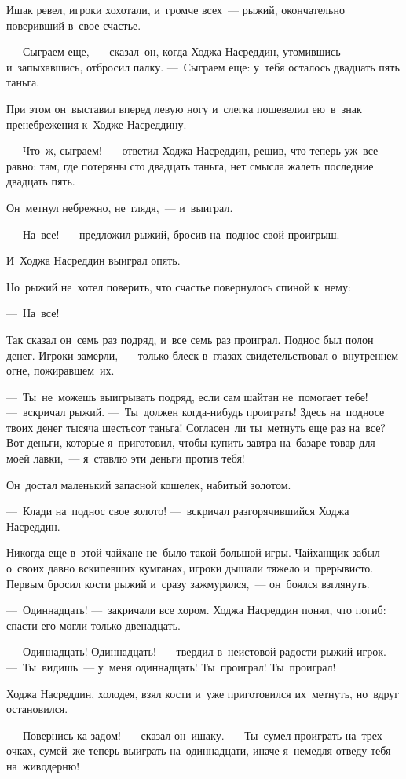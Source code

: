 \documentclass[12pt,a4paper]{book}
\begin{document}
Ишак ревел, игроки хохотали, и~громче всех~— рыжий, окончательно поверивший в~свое счастье.

—~Сыграем еще,~— сказал~он, когда Ходжа Насреддин, утомившись и~запыхавшись, отбросил палку. —~Сыграем еще: у~тебя осталось двадцать пять таньга.

При этом он~выставил вперед левую ногу и~слегка пошевелил ею~в~знак пренебрежения к~Ходже Насреддину.

—~Что~ж, сыграем! —~ответил Ходжа Насреддин, решив, что теперь уж~все равно: там, где потеряны сто двадцать таньга, нет смысла жалеть последние двадцать пять.

Он~метнул небрежно, не~глядя,~— и~выиграл.

—~На~все! —~предложил рыжий, бросив на~поднос свой проигрыш.

И~Ходжа Насреддин выиграл опять.

Но~рыжий не~хотел поверить, что счастье повернулось спиной к~нему:

—~На~все!

Так сказал он~семь раз подряд, и~все семь раз проиграл. Поднос был полон денег. Игроки замерли,~— только блеск в~глазах свидетельствовал о~внутреннем огне, пожиравшем~их.

—~Ты~не~можешь выигрывать подряд, если сам шайтан не~помогает тебе! —~вскричал рыжий. —~Ты~должен когда-нибудь проиграть! Здесь на~подносе твоих денег тысяча шестьсот таньга! Согласен~ли ты~метнуть еще раз на~все? Вот деньги, которые я~приготовил, чтобы купить завтра на~базаре товар для моей лавки,~— я~ставлю эти деньги против тебя!

Он~достал маленький запасной кошелек, набитый золотом.

—~Клади на~поднос свое золото! —~вскричал разгорячившийся Ходжа Насреддин.

Никогда еще в~этой чайхане не~было такой большой игры. Чайханщик забыл о~своих давно вскипевших кумганах, игроки дышали тяжело и~прерывисто. Первым бросил кости рыжий и~сразу зажмурился,~— он~боялся взглянуть.

—~Одиннадцать! —~закричали все хором. Ходжа Насреддин понял, что погиб: спасти его могли только двенадцать.

—~Одиннадцать! Одиннадцать! —~твердил в~неистовой радости рыжий игрок. —~Ты~видишь~— у~меня одиннадцать! Ты~проиграл! Ты~проиграл!

Ходжа Насреддин, холодея, взял кости и~уже приготовился их~метнуть, но~вдруг остановился.

—~Повернись-ка задом! —~сказал он~ишаку. —~Ты~сумел проиграть на~трех очках, сумей~же теперь выиграть на~одиннадцати, иначе я~немедля отведу тебя на~живодерню!
\end{document}

